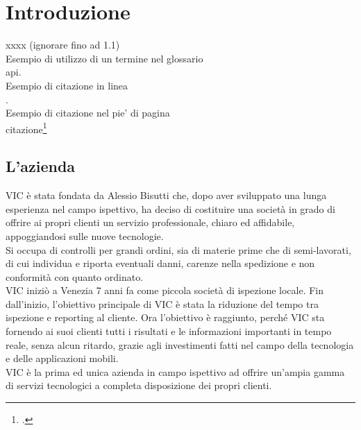 
\chapter{Introduzione}
\label{cap:introduzione}
xxxx (ignorare fino ad 1.1)\\


\noindent Esempio di utilizzo di un termine nel glossario \\
\gls{api}. \\

\noindent Esempio di citazione in linea \\
\cite{site:agile-manifesto}. \\

\noindent Esempio di citazione nel pie' di pagina \\
citazione\footcite{womak:lean-thinking} \\

\section{L'azienda}

VIC è stata fondata da Alessio Bisutti che, dopo aver sviluppato una lunga esperienza nel campo ispettivo, ha deciso di costituire una società in grado di offrire ai propri clienti un servizio professionale, chiaro ed affidabile, appoggiandosi sulle nuove tecnologie.\\
Si occupa di controlli per grandi ordini, sia di materie prime che di semi-lavorati, di cui individua e riporta eventuali danni, carenze nella spedizione e non conformità con quanto ordinato.\\
VIC iniziò a Venezia 7 anni fa come piccola società di ispezione locale. Fin dall'inizio, l'obiettivo principale di VIC è stata la riduzione del tempo tra ispezione e reporting al cliente. Ora l'obiettivo è raggiunto, perché VIC sta fornendo ai suoi clienti tutti i risultati e le informazioni importanti in tempo reale, senza alcun ritardo, grazie agli investimenti fatti nel campo della tecnologia e delle applicazioni mobili.\\
VIC è la prima ed unica azienda in campo ispettivo ad offrire un'ampia gamma di servizi tecnologici a completa disposizione dei propri clienti. 

